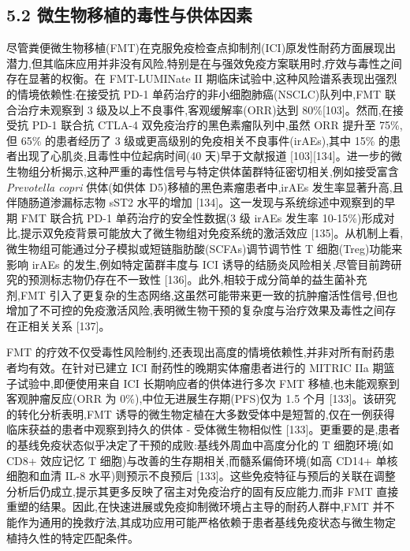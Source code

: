 \documentclass[11pt]{article}
\begin{document}
\subsection{5.2 微生物移植的毒性与供体因素}\label{ux5faeux751fux7269ux79fbux690dux7684ux6bd2ux6027ux4e0eux4f9bux4f53ux56e0ux7d20}

尽管粪便微生物移植(FMT)在克服免疫检查点抑制剂(ICI)原发性耐药方面展现出潜力,但其临床应用并非没有风险,特别是在与强效免疫方案联用时,疗效与毒性之间存在显著的权衡。在 FMT-LUMINate II 期临床试验中,这种风险谱系表现出强烈的情境依赖性:在接受抗 PD-1 单药治疗的非小细胞肺癌(NSCLC)队列中,FMT 联合治疗未观察到 3 级及以上不良事件,客观缓解率(ORR)达到 80\%{[}103{]}。然而,在接受抗 PD-1 联合抗 CTLA-4 双免疫治疗的黑色素瘤队列中,虽然 ORR 提升至 75\%,但 65\% 的患者经历了 3 级或更高级别的免疫相关不良事件(irAEs),其中 15\% 的患者出现了心肌炎,且毒性中位起病时间(40 天)早于文献报道 {[}103{]}{[}134{]}。进一步的微生物组分析揭示,这种严重的毒性信号与特定供体菌群特征密切相关,例如接受富含 \emph{Prevotella copri} 供体(如供体 D5)移植的黑色素瘤患者中,irAEs 发生率显著升高,且伴随肠道渗漏标志物 sST2 水平的增加 {[}134{]}。这一发现与系统综述中观察到的早期 FMT 联合抗 PD-1 单药治疗的安全性数据(3 级 irAEs 发生率 10-15\%)形成对比,提示双免疫背景可能放大了微生物组对免疫系统的激活效应 {[}135{]}。从机制上看,微生物组可能通过分子模拟或短链脂肪酸(SCFAs)调节调节性 T 细胞(Treg)功能来影响 irAEs 的发生,例如特定菌群丰度与 ICI 诱导的结肠炎风险相关,尽管目前跨研究的预测标志物仍存在不一致性 {[}136{]}。此外,相较于成分简单的益生菌补充剂,FMT 引入了更复杂的生态网络,这虽然可能带来更一致的抗肿瘤活性信号,但也增加了不可控的免疫激活风险,表明微生物干预的复杂度与治疗效果及毒性之间存在正相关关系 {[}137{]}。

FMT 的疗效不仅受毒性风险制约,还表现出高度的情境依赖性,并非对所有耐药患者均有效。在针对已建立 ICI 耐药性的晚期实体瘤患者进行的 MITRIC IIa 期篮子试验中,即便使用来自 ICI 长期响应者的供体进行多次 FMT 移植,也未能观察到客观肿瘤反应(ORR 为 0\%),中位无进展生存期(PFS)仅为 1.5 个月 {[}133{]}。该研究的转化分析表明,FMT 诱导的微生物定植在大多数受体中是短暂的,仅在一例获得临床获益的患者中观察到持久的供体 - 受体微生物相似性 {[}133{]}。更重要的是,患者的基线免疫状态似乎决定了干预的成败:基线外周血中高度分化的 T 细胞环境(如 CD8+ 效应记忆 T 细胞)与改善的生存期相关,而髓系偏倚环境(如高 CD14+ 单核细胞和血清 IL-8 水平)则预示不良预后 {[}133{]}。这些免疫特征与预后的关联在调整分析后仍成立,提示其更多反映了宿主对免疫治疗的固有反应能力,而非 FMT 直接重塑的结果。因此,在快速进展或免疫抑制微环境占主导的耐药人群中,FMT 并不能作为通用的挽救疗法,其成功应用可能严格依赖于患者基线免疫状态与微生物定植持久性的特定匹配条件。
\end{document}
